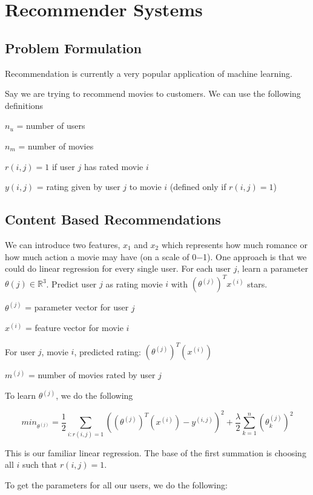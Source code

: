 \documentclass[a4paper,11pt]{report}
\begin{document}
\section{Recommender Systems}

\subsection*{Problem Formulation}

Recommendation is currently a very popular application of machine learning.

Say we are trying to recommend movies to customers. We can use the following definitions

$n_u$ = number of users

$n_m$ = number of movies

$r(i,j) = 1$ if user $j$ has rated movie $i$

$y(i,j)$ = rating given by user $j$ to movie $i$ (defined only if $r(i,j)=1$)

\subsection*{Content Based Recommendations}

We can introduce two features, $x_1$ and $x_2$ which represents how much romance or how much action a movie may have (on a scale of 0−1). One approach is that we could do linear regression for every single user. For each user $j$, learn a parameter $\theta(j)\in \mathbb{R}^3$. Predict user $j$ as rating movie $i$ with $(\theta^{(j)})^Tx^{(i)}$ stars.

$\theta^{(j)}$ = parameter vector for user $j$

$x^{(i)}$ = feature vector for movie $i$

For user $j$, movie $i$, predicted rating: $(\theta^{(j)})^T(x^{(i)})$

$m^{(j)}$ = number of movies rated by user $j$

To learn $\theta^{(j)}$, we do the following

$$min_{\theta^{(j)}} = \dfrac{1}{2}\displaystyle \sum_{i:r(i,j)=1} ((\theta^{(j)})^T(x^{(i)}) - y^{(i,j)})^2 + \dfrac{\lambda}{2} \sum_{k=1}^n(\theta_k^{(j)})^2$$

This is our familiar linear regression. The base of the first summation is choosing all $i$ such that $r(i,j) = 1$.

To get the parameters for all our users, we do the following:
\end{document}

